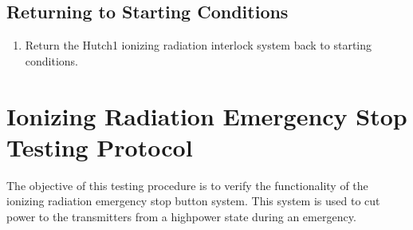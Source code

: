 \documentclass[letterpaper,10pt,english]{sphinxmanual}
\begin{document}
\subsection{Returning to Starting Conditions}
\label{\detokenize{testing_documentation/Hutch-1_ionizing_radiation:returning-to-starting-conditions}}\begin{enumerate}
%
\item {} 
\sphinxAtStartPar
Return the Hutch\sphinxhyphen{}1 ionizing radiation interlock system back to starting conditions.

\end{enumerate}

\sphinxstepscope


\section{Ionizing Radiation Emergency Stop Testing Protocol}
\label{\detokenize{testing_documentation/e-stop_testing:ionizing-radiation-emergency-stop-testing-protocol}}\label{\detokenize{testing_documentation/e-stop_testing::doc}}
\sphinxAtStartPar
The objective of this testing procedure is to verify the functionality of the ionizing radiation emergency stop button system.
This system is used to cut power to the transmitters from a high\sphinxhyphen{}power state during an emergency.
\end{document}
